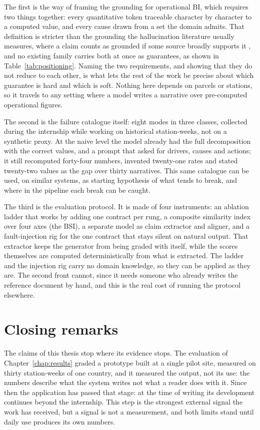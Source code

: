 \documentclass[12pt,a4paper,openright,twoside]{book}
\begin{document}
The first is the way of framing the grounding for operational \ac{BI}, which requires two things together: every quantitative token traceable character by character to a computed value, and every cause drawn from a set the domain admits.
That definition is stricter than the grounding the hallucination literature usually measures, where a claim counts as grounded if some source broadly supports it \cite{ji2023survey,min2023factscore}, and no existing family carries both at once as guarantees, as shown in Table~\ref{tab:positioning}.
Naming the two requirements, and showing that they do not reduce to each other, is what lets the rest of the work be precise about which guarantee is hard and which is soft.
Nothing here depends on parcels or stations, so it travels to any setting where a model writes a narrative over pre-computed operational figures.

The second is the failure catalogue itself: eight modes in three classes, collected during the internship while working on historical station-weeks, not on a synthetic proxy.
At the naive level the model already had the full decomposition with the correct values, and a prompt that asked for drivers, causes and actions; it still recomputed forty-four numbers, invented twenty-one rates and stated twenty-two values as the gap over thirty narratives.
This same catalogue can be used, on similar systems, as starting hypothesis of what tends to break, and where in the pipeline each break can be caught.

The third is the evaluation protocol.
It is made of four instruments: an ablation ladder that works by adding one contract per rung, a composite similarity index over four axes (the \ac{BSI}), a separate model as claim extractor and aligner, and a fault-injection rig for the one contract that stays silent on natural output.
That extractor keeps the generator from being graded with itself, while the scores themselves are computed deterministically from what is extracted.
The ladder and the injection rig carry no domain knowledge, so they can be applied as they are.
The second front cannot, since it needs someone who already writes the reference document by hand, and this is the real cost of running the protocol elsewhere. 

\section{Closing remarks}
\label{sec:closing}

The claims of this thesis stop where its evidence stops.
The evaluation of Chapter~\ref{chap:results} graded a prototype built at a single pilot site, measured on thirty station-weeks of one country, and it measured the output, not its use: the numbers describe what the system writes not what a reader does with it.
Since then the application has passed that stage: at the time of writing its development continues beyond the internship.
This step is the strongest external signal the work has received, but a signal is not a measurement, and both limits stand until daily use produces its own numbers.
\end{document}
